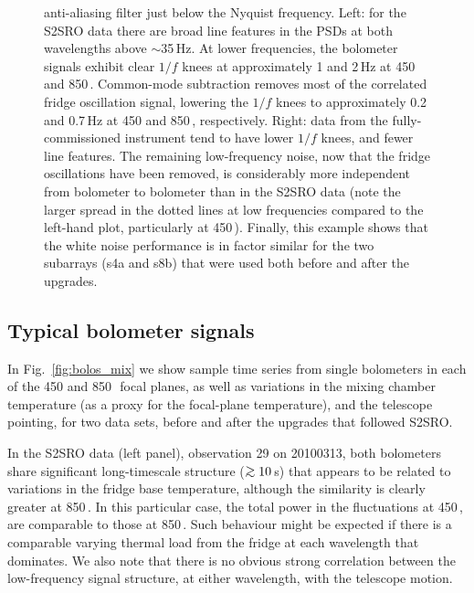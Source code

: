\documentclass[useAMS,usenatbib,nofootinbib]{mn2e}
\def\gsim{\mathrel{\lower2.5pt\vbox{\lineskip=0pt\baselineskip=0pt
          \hbox{$>$}\hbox{$\sim$}}}}
\begin{document}
\begin{figure}
{  anti-aliasing filter just below the Nyquist frequency.  Left: for
  the S2SRO data there are broad line features in the PSDs at both
  wavelengths above $\sim$35\,Hz.  At lower frequencies, the bolometer
  signals exhibit clear $1/f$ knees at approximately 1 and 2\,Hz at
  450 and 850\,\micron. Common-mode subtraction removes most of the
  correlated fridge oscillation signal, lowering the $1/f$ knees to
  approximately 0.2 and 0.7\,Hz at 450 and 850\,\micron,
  respectively. Right: data from the fully-commissioned instrument
  tend to have lower $1/f$ knees, and fewer line features. The
  remaining low-frequency noise, now that the fridge oscillations have
  been removed, is considerably more independent from bolometer to
  bolometer than in the S2SRO data (note the larger spread in the
  dotted lines at low frequencies compared to the left-hand plot,
  particularly at 450\,\micron). Finally, this example shows that the
  white noise performance is in factor similar for the two subarrays
  (s4a and s8b) that were used both before and after the upgrades.}
\label{fig:pspec}
\end{figure}


\subsection{Typical bolometer signals}
\label{sec:bolosignal}

In Fig.~\ref{fig:bolos_mix} we show sample time series from single
bolometers in each of the 450 and 850\,\micron\ focal planes, as well
as variations in the mixing chamber temperature (as a proxy for the
focal-plane temperature), and the telescope pointing, for two data
sets, before and after the upgrades that followed S2SRO.

In the S2SRO data (left panel), observation 29 on 20100313, both
bolometers share significant long-timescale structure ($\gsim10$\,s)
that appears to be related to variations in the fridge base
temperature, although the similarity is clearly greater at
850\,\micron. In this particular case, the total power in the
fluctuations at 450\,\micron, are comparable to those at
850\,\micron. Such behaviour might be expected if there is a
comparable varying thermal load from the fridge at each wavelength
that dominates. We also note that there is no obvious strong
correlation between the low-frequency signal structure, at either
wavelength, with the telescope motion.
\end{document}
